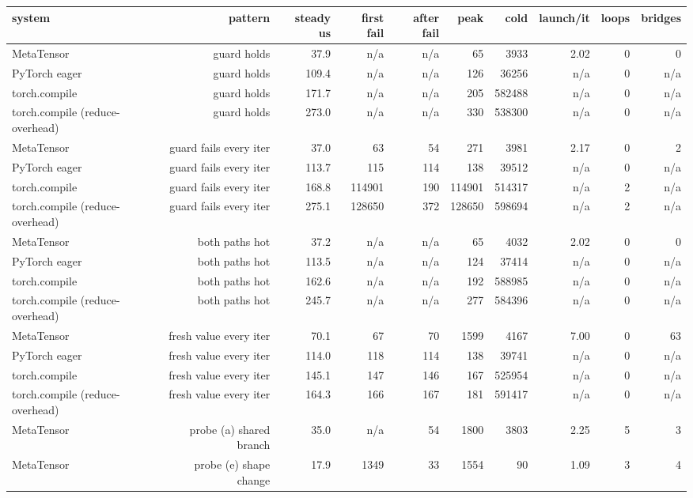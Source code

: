 \begin{tabular}{lrrrrrrrrr}
\toprule
system & pattern & steady us & first fail & after fail & peak & cold & launch/it & loops & bridges \\
\midrule
MetaTensor & guard holds & 37.9 & n/a & n/a & 65 & 3933 & 2.02 & 0 & 0 \\
PyTorch eager & guard holds & 109.4 & n/a & n/a & 126 & 36256 & n/a & 0 & n/a \\
torch.compile & guard holds & 171.7 & n/a & n/a & 205 & 582488 & n/a & 0 & n/a \\
torch.compile (reduce-overhead) & guard holds & 273.0 & n/a & n/a & 330 & 538300 & n/a & 0 & n/a \\
MetaTensor & guard fails every iter & 37.0 & 63 & 54 & 271 & 3981 & 2.17 & 0 & 2 \\
PyTorch eager & guard fails every iter & 113.7 & 115 & 114 & 138 & 39512 & n/a & 0 & n/a \\
torch.compile & guard fails every iter & 168.8 & 114901 & 190 & 114901 & 514317 & n/a & 2 & n/a \\
torch.compile (reduce-overhead) & guard fails every iter & 275.1 & 128650 & 372 & 128650 & 598694 & n/a & 2 & n/a \\
MetaTensor & both paths hot & 37.2 & n/a & n/a & 65 & 4032 & 2.02 & 0 & 0 \\
PyTorch eager & both paths hot & 113.5 & n/a & n/a & 124 & 37414 & n/a & 0 & n/a \\
torch.compile & both paths hot & 162.6 & n/a & n/a & 192 & 588985 & n/a & 0 & n/a \\
torch.compile (reduce-overhead) & both paths hot & 245.7 & n/a & n/a & 277 & 584396 & n/a & 0 & n/a \\
MetaTensor & fresh value every iter & 70.1 & 67 & 70 & 1599 & 4167 & 7.00 & 0 & 63 \\
PyTorch eager & fresh value every iter & 114.0 & 118 & 114 & 138 & 39741 & n/a & 0 & n/a \\
torch.compile & fresh value every iter & 145.1 & 147 & 146 & 167 & 525954 & n/a & 0 & n/a \\
torch.compile (reduce-overhead) & fresh value every iter & 164.3 & 166 & 167 & 181 & 591417 & n/a & 0 & n/a \\
MetaTensor & probe (a) shared branch & 35.0 & n/a & 54 & 1800 & 3803 & 2.25 & 5 & 3 \\
MetaTensor & probe (e) shape change & 17.9 & 1349 & 33 & 1554 & 90 & 1.09 & 3 & 4 \\
\bottomrule
\end{tabular}
